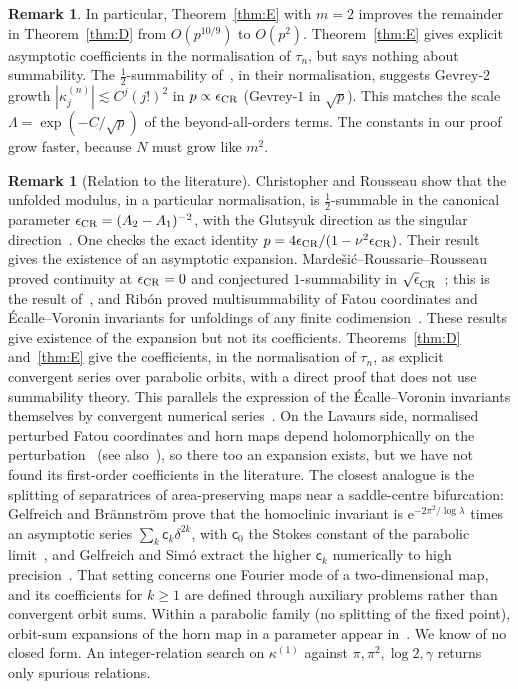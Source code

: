 \documentclass[11pt]{amsart}
\theoremstyle{definition}
\newtheorem{remark}[theorem]{Remark}
\newcommand{\eee}{\mathrm{e}}
\begin{document}
\begin{remark}
In particular, Theorem~\ref{thm:E} with $m=2$ improves the remainder in
Theorem~\ref{thm:D} from $O(p^{10/9})$ to $O(p^2)$.
Theorem~\ref{thm:E} gives explicit asymptotic coefficients in the normalisation
of $\tau_n$, but says nothing about summability.  The
$\tfrac12$-summability of~\cite{ChristopherRousseau}, in their normalisation,
suggests Gevrey-$2$ growth $|\kappa^{(n)}_j|\lesssim C^j(j!)^2$ in $p\propto\epsilon_{\rm CR}$
(Gevrey-$1$ in $\sqrt p$).  This matches the scale $\Lambda=\exp(-C/\sqrt p)$ of the
beyond-all-orders terms.
The constants in our proof grow faster, because $N$ must grow like $m^2$.
\end{remark}

\begin{remark}[Relation to the literature]
Christopher and Rousseau show that the unfolded modulus, in a particular
normalisation, is $\tfrac12$-summable in the canonical parameter
$\epsilon_{\rm CR}=(A_2-A_1)^{-2}$, with the Glutsyuk direction as the singular
direction~\cite[Cor.~4.9]{ChristopherRousseau}.  One checks the exact identity
$p=4\epsilon_{\rm CR}/(1-\nu^2\epsilon_{\rm CR})$.  Their result gives the existence of an
asymptotic expansion.  Marde\v{s}i\'c--Roussarie--Rousseau proved continuity
at $\epsilon_{\rm CR}=0$ and conjectured $1$-summability in
$\sqrt\epsilon_{\rm CR}$~\cite[\S11]{MRR2004}; this is the result
of~\cite{ChristopherRousseau}, and Rib\'on proved multisummability of Fatou
coordinates and \'Ecalle--Voronin invariants for unfoldings of any finite
codimension~\cite{Ribon2010}.  These results give existence of the expansion
but not its coefficients.  Theorems~\ref{thm:D} and~\ref{thm:E} give the
coefficients, in the normalisation of $\tau_n$, as explicit convergent series
over parabolic orbits, with a direct proof that does not use summability
theory.  This parallels the expression of the \'Ecalle--Voronin invariants
themselves by convergent numerical series~\cite{DudkoSauzin2014}.
On the Lavaurs side, normalised perturbed Fatou coordinates and horn maps
depend holomorphically on the perturbation~\cite{Shishikura2000}
(see also~\cite[Thms.~1.3, 2.1]{InouShishikura}), so there too an expansion
exists, but we have not found its first-order coefficients in the literature.
The closest analogue is the splitting of separatrices of area-preserving maps
near a saddle-centre bifurcation: Gelfreich and Br\"annstr\"om prove that the
homoclinic invariant is $\eee^{-2\pi^2/\log\lambda}$ times an asymptotic series
$\sum_k \mathsf c_k\delta^{2k}$, with $\mathsf c_0$ the Stokes constant of the parabolic
limit~\cite{GelfreichBrannstrom,GelfreichSauzin2001}, and Gelfreich and Sim\'o
extract the higher $\mathsf c_k$ numerically to high precision~\cite{GelfreichSimo2008}.
That setting concerns one Fourier mode of a two-dimensional map, and its
coefficients for $k\ge1$ are defined through auxiliary problems rather than
convergent orbit sums.  Within a parabolic family (no splitting of the fixed
point), orbit-sum expansions of the horn map in a parameter appear
in~\cite[Prop.~9.1]{BuffEcalleEpstein2013}.  We know of no
closed form.  An integer-relation search on $\kappa^{(1)}$ against
$\pi,\pi^2,\log2,\gamma$ returns only spurious relations.
\end{remark}
\end{document}
